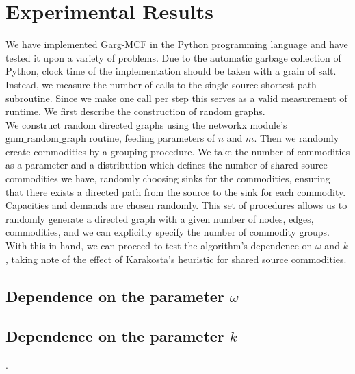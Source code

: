 \section{Experimental Results}

We have implemented Garg-MCF in the Python programming language and
have tested it upon a variety of problems. Due to the automatic
garbage collection of Python, clock time of the implementation should
be taken with a grain of salt. Instead, we measure the number of calls
to the single-source shortest path subroutine. Since we make one call
per step this serves as a valid measurement of runtime. We first
describe the construction of random graphs. \\
We construct random directed graphs using the networkx module's
$\mathrm{gnm\_random\_graph}$ routine, feeding parameters of $n$ and
$m$. Then we randomly create commodities by a grouping
procedure. We take the number of commodities as a parameter and a
distribution which defines the number of shared source commodities we
have, randomly choosing sinks for the commodities, ensuring that there
exists a directed path from the source to the sink for each
commodity. Capacities and demands are chosen randomly. This set of
procedures allows us to randomly generate a directed graph with a
given number of nodes, edges, commodities, and we can explicitly specify the
number of commodity groups. With this in hand, we can proceed to test
the algorithm's dependence on $\omega$ and $k$, taking note of the
effect of Karakosta's heuristic for shared source commodities.
\subsection{Dependence on the parameter $\omega$}

\subsection{Dependence on the parameter $k$}.

